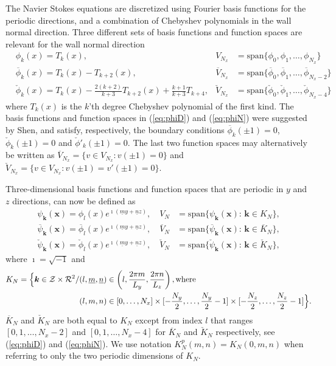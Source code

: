 \documentclass[11pt, oneside]{article}
\newcommand{\N}[1]{\check{#1}}
\newcommand{\D}[1]{\overline{#1}}
\begin{document}
The Navier Stokes equations are discretized using Fourier basis functions for the periodic directions, and a combination of Chebyshev polynomials in the wall normal direction. Three different sets of basis functions and function spaces are relevant for the wall normal direction
\begin{align}
&  \phi_k(x) = T_k(x), & V_{N_x} &= \text{span}\{\phi_0, \phi_1,\ldots, \phi_{N_x}\} \label{eq:Tk}\\
& \D{\phi}_k(x) = T_k(x) - T_{k+2}(x), & \D{V}_{N_x} &= \text{span} \{ \D{\phi}_0, \D{\phi}_1, \ldots, \D{\phi}_{N_x-2} \} \label{eq:phiD}\\
& \N{\phi}_k(x) = T_k(x) - \frac{2(k+2)}{k+3} T_{k+2}(x) + 
\frac{k+1}{k+3} T_{k+4}, & \N{V}_{N_x} &= \text{span} \{\N{\phi}_0, \N{\phi}_1, 
\ldots, \N{\phi}_{N_x-4} \} \label{eq:phiN} 
\end{align}
where $T_k(x)$ is the $k$'th degree Chebyshev polynomial of the first kind. The 
basis functions and function spaces in (\ref{eq:phiD}) and (\ref{eq:phiN}) were 
suggested by Shen, and satisfy, respectively, the boundary conditions 
$\D{\phi}_k(\pm 1) = 0$, $\N{\phi}_k(\pm 1)=0$ and $\N{\phi}'_k(\pm 1)=0$. The 
last two function spaces may alternatively be written as $\D{V}_{N_x} = \{v \in 
V_{N_x}: v(\pm 1)=0 \}$ and $\N{V}_{N_x} = \{v \in V_{N_x}: v(\pm 1) = v'(\pm 
1) = 0 \}$.  

Three-dimensional basis functions and function spaces that are periodic in $y$ 
and $z$ directions, can now be defined as
\begin{align}
  \psi_{\bm{k}}(\bm{x}) = \phi_{l}(x)e^{ \imath(\underline{m} y + \underline{n} z)}, \quad V_N &= \text{span} \{ \psi_{\bm{k}}(\bm{x}):\, \bm{k} \in K_N  \}, \\
  \D{\psi}_{\bm{k}}(\bm{x}) = \D{\phi}_{l}(x)e^{ \imath(\underline{m} y + \underline{n} z)}, \quad \D{V}_N &= \text{span} \{ \D{\psi}_{\bm{k}}(\bm{x}):\, \bm{k} \in \D{K}_N  \}, \\
  \N{\psi}_{\bm{k}}(\bm{x}) = \N{\phi}_{l}(x)e^{ \imath(\underline{m} y + \underline{n} z)}, \quad \N{V}_N &= \text{span} \{ \N{\psi}_{\bm{k}}(\bm{x}):\, \bm{k} \in \N{K}_N  \},
\end{align}
where $\imath=\sqrt{-1}$ and 
\begin{align}
K_N = \Big\{\bm{k} \in \mathcal{Z}\times\mathcal{R}^2 / &(l, \underline{m}, \underline{n}) \in \left( l, \frac{2 \pi m}{L_y}, \frac{2 \pi n}{L_z} \right), \text{where} \notag \\
 &(l, m, n) \in  [0, \ldots, N_x] \times [-\frac{N_y}{2},\ldots, \frac{N_y}{2}-1] \times[-\frac{N_z}{2},\ldots, \frac{N_z}{2}-1] \Big\}. \label{eq:wavenumbermesh}
\end{align}
$\D{K}_N$ and $\N{K}_N$ are both equal to $K_N$ except from index $l$ that 
ranges $[0, 1, \ldots, N_x-2]$ and $[0, 1, \ldots, N_x-4]$ for $\D{K}_N$ 
and $\N{K}_N$ respectively, see (\ref{eq:phiD}) and (\ref{eq:phiN}). We use 
notation $K_N^p(m, n)=K_N(0, m, n)$ when referring to only the two periodic 
dimensions of $K_N$.
\end{document}
